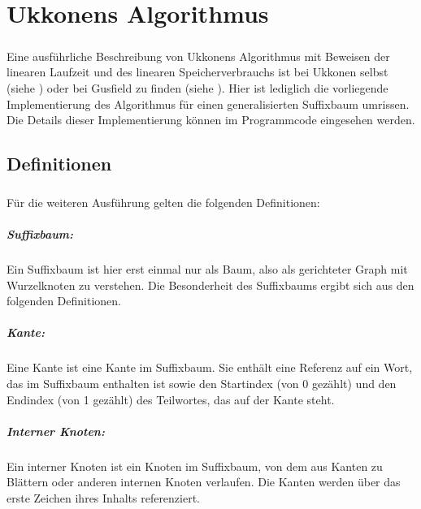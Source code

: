 

\chapter{Ukkonens Algorithmus}
\label{ukkonen}

\paragraph{} Eine ausführliche Beschreibung von Ukkonens Algorithmus mit Beweisen der linearen Laufzeit und des linearen Speicherverbrauchs ist bei Ukkonen selbst (siehe \cite{ukkonen}) oder bei Gusfield zu finden (siehe \cite{gusfield}). Hier ist lediglich die vorliegende Implementierung des Algorithmus für einen generalisierten Suffixbaum umrissen. Die Details dieser Implementierung können im Programmcode eingesehen werden.

\section{Definitionen}

\paragraph{} Für die weiteren Ausführung gelten die folgenden Definitionen:

\paragraph{Suffixbaum:} Ein Suffixbaum ist hier erst einmal nur als Baum, also als gerichteter Graph mit Wurzelknoten zu verstehen. Die Besonderheit des Suffixbaums ergibt sich aus den folgenden Definitionen.

\paragraph{Kante:} Eine Kante ist eine Kante im Suffixbaum. Sie enthält eine Referenz auf ein Wort, das im Suffixbaum enthalten ist sowie den Startindex (von 0 gezählt) und den Endindex (von 1 gezählt) des Teilwortes, das auf der Kante steht.

\paragraph{Interner Knoten:} Ein interner Knoten ist ein Knoten im Suffixbaum, von dem aus Kanten zu Blättern oder anderen internen Knoten verlaufen. Die Kanten werden über das erste Zeichen ihres Inhalts referenziert.

